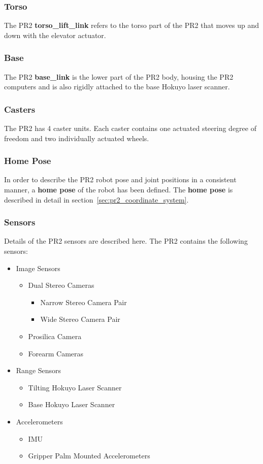 \subsubsection{Torso}
The PR2 {\bf torso\_lift\_link} refers to the torso part of the PR2 that moves up and down with the elevator actuator.

\subsubsection{Base}
The PR2 {\bf base\_link} is the lower part of the PR2 body, housing the PR2 computers and is also rigidly attached to the base Hokuyo laser scanner.

\subsubsection{Casters}
The PR2 has 4 caster units.  Each caster contains one actuated steering degree of freedom and two individually actuated wheels.

\subsubsection{Home Pose}
In order to describe the PR2 robot pose and joint positions in a consistent manner, a {\bf home pose} of the robot has been defined.  The {\bf home pose} is described in detail in section~\ref{sec:pr2_coordinate_system}.

\subsubsection{Sensors}
\label{subsec:pr2_sensors}
Details of the PR2 sensors are described here.
The PR2 contains the following sensors:
\begin{itemize}
\item Image Sensors
  \begin{itemize}
  \item Dual Stereo Cameras
    \begin{itemize}
    \item Narrow Stereo Camera Pair
    \item Wide Stereo Camera Pair
    \end{itemize}
  \item Prosilica Camera
  \item Forearm Cameras
  \end{itemize}
\item Range Sensors
  \begin{itemize}
  \item Tilting Hokuyo Laser Scanner
  \item Base Hokuyo Laser Scanner
  \end{itemize}
\item Accelerometers
  \begin{itemize}
  \item IMU
  \item Gripper Palm Mounted Accelerometers
  \end{itemize}
\end{itemize}


